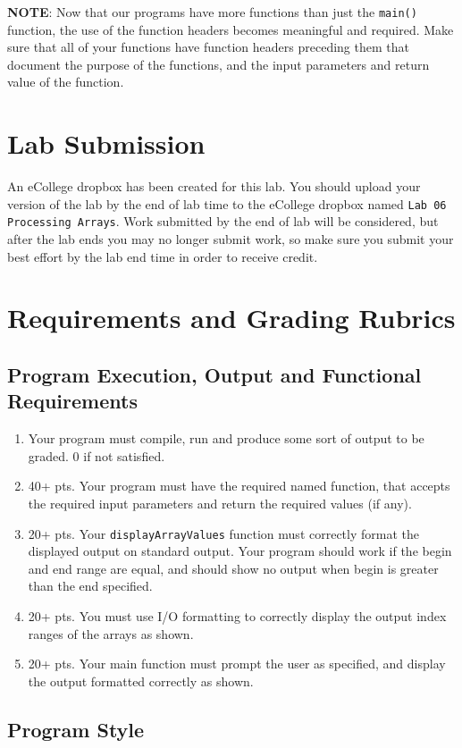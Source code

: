 \documentclass[11pt]{article}
\begin{document}
\textbf{NOTE}: Now that our programs have more functions than just the
\verb~main()~ function, the use of the function headers becomes meaningful
and required.  Make sure that all of your functions have function
headers preceding them that document the purpose of the functions, and
the input parameters and return value of the function.
\section*{Lab Submission}
\label{sec-4}


An eCollege dropbox has been created for this lab.  You should
upload your version of the lab by the end of lab time to the eCollege
dropbox named \verb~Lab 06 Processing Arrays~.  Work submitted by the end
of lab will be considered, but after the lab ends you may no longer
submit work, so make sure you submit your best effort by the lab end
time in order to receive credit.
\section*{Requirements and Grading Rubrics}
\label{sec-5}
\subsection*{Program Execution, Output and Functional Requirements}
\label{sec-5-1}


\begin{enumerate}
\item Your program must compile, run and produce some sort of output to be
  graded. 0 if not satisfied.
\item 40+ pts.  Your program must have the required named function,
   that accepts the required input parameters and return the required
   values (if any).
\item 20+ pts. Your \verb~displayArrayValues~ function must correctly format
   the displayed output on standard output.  Your program should work
   if the begin and end range are equal, and should show no output
   when begin is greater than the end specified.
\item 20+ pts.  You must use I/O formatting to correctly display the
   output index ranges of the arrays as shown.
\item 20+ pts. Your main function must prompt the user as specified, and
   display the output formatted correctly as shown.
\end{enumerate}
\subsection*{Program Style}
\label{sec-5-2}
\end{document}
